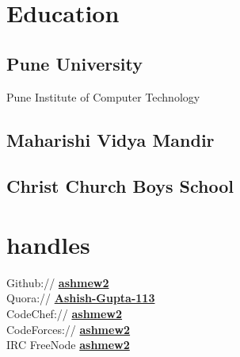 \documentclass[letterpaper]{deedy-resume} %
\begin{document}
\lastupdated %
\begin{minipage}[t]{0.33\textwidth} %
\section{Education}
\subsection{Pune University}
Pune Institute of Computer Technology \\
\sectionspace %
\subsection{Maharishi Vidya Mandir}
\sectionspace %
\subsection{Christ Church Boys School}
\sectionspace %
\section{handles}
Github:// \href{https://github.com/ashmew2}{\bf ashmew2} \\
Quora:// \href{http://www.quora.com/Ashish-Gupta-113}{\bf Ashish-Gupta-113} \\
CodeChef:// \href{http://www.codechef.com/users/ashmew2}{\bf ashmew2} \\
CodeForces:// \href{http://codeforces.com/profile/ashmew2}{\bf ashmew2} \\
IRC FreeNode \href{http://freenode.org} {\bf ashmew2} \\
\sectionspace %

\end{minipage}
\end{document}
